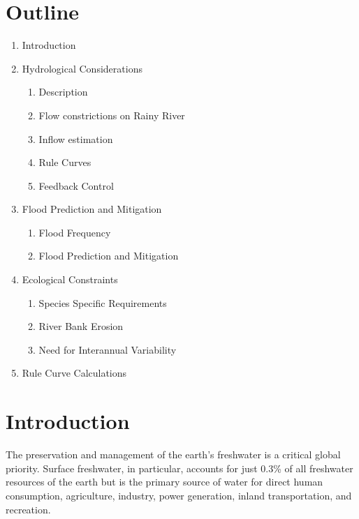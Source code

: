 \documentclass[preprint,times]{elsarticle}
\begin{document}
\section*{Outline}
\begin{enumerate}
    \item Introduction
    \item Hydrological Considerations
    \begin{enumerate}
        \item Description
        \item Flow constrictions on Rainy River
        \item Inflow estimation
        \item Rule Curves
        \item Feedback Control
    \end{enumerate}
    \item Flood Prediction and Mitigation
    \begin{enumerate}
        \item Flood Frequency
        \item Flood Prediction and Mitigation
    \end{enumerate}
    \item Ecological Constraints
    \begin{enumerate}
        \item Species Specific Requirements
        \item River Bank Erosion
        \item Need for Interannual Variability
    \end{enumerate}
    \item Rule Curve Calculations
\end{enumerate}

\section{Introduction}
\noindent

The preservation and management of the earth's freshwater is a critical global priority. Surface freshwater, in particular, accounts for just 0.3\% of all freshwater resources of the earth but is the primary source of water for direct human consumption, agriculture, industry, power generation, inland transportation, and recreation. 
\end{document}
